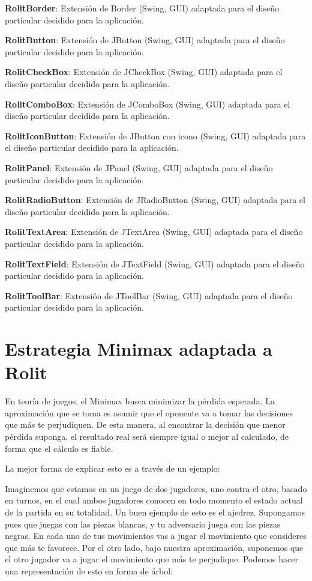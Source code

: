 \documentclass[../DocumentoOficial.tex]{subfiles}
\begin{document}
\textbf{RolitBorder}: Extensión de Border (Swing, GUI) adaptada para el diseño particular decidido para la aplicación.

\textbf{RolitButton}: Extensión de JButton (Swing, GUI) adaptada para el diseño particular decidido para la aplicación.

\textbf{RolitCheckBox}: Extensión de JCheckBox (Swing, GUI) adaptada para el diseño particular decidido para la aplicación.

\textbf{RolitComboBox}: Extensión de JComboBox (Swing, GUI) adaptada para el diseño particular decidido para la aplicación.

\textbf{RolitIconButton}: Extensión de JButton con icono (Swing, GUI) adaptada para el diseño particular decidido para la aplicación.

\textbf{RolitPanel}: Extensión de JPanel (Swing, GUI) adaptada para el diseño particular decidido para la aplicación.

\textbf{RolitRadioButton}: Extensión de JRadioButton (Swing, GUI) adaptada para el diseño particular decidido para la aplicación.

\textbf{RolitTextArea}: Extensión de JTextArea (Swing, GUI) adaptada para el diseño particular decidido para la aplicación.

\textbf{RolitTextField}: Extensión de JTextField (Swing, GUI) adaptada para el diseño particular decidido para la aplicación.

\textbf{RolitToolBar}: Extensión de JToolBar (Swing, GUI) adaptada para el diseño particular decidido para la aplicación.

\chapter{Estrategia Minimax adaptada a Rolit}
\label{ch:AnexoIII}

En teoría de juegos, el Minimax busca minimizar la pérdida esperada. La aproximación que se toma es asumir que el oponente va a tomar las decisiones que más te perjudiquen. De esta manera, al encontrar la decisión que menor pérdida suponga, el resultado real será siempre igual o mejor al calculado, de forma que el cálculo es fiable.

La mejor forma de explicar esto es a través de un ejemplo:

Imaginemos que estamos en un juego de dos jugadores, uno contra el otro, basado en turnos, en el cual ambos jugadores conocen en todo momento el estado actual de la partida en su totalidad. Un buen ejemplo de esto es el ajedrez. Supongamos pues que juegas con las piezas blancas, y tu adversario juega con las piezas negras. En cada uno de tus movimientos vas a jugar el movimiento que consideres que más te favorece. Por el otro lado, bajo nuestra aproximación, suponemos que el otro jugador va a jugar el movimiento que más te perjudique. Podemos hacer una representación de esto en forma de árbol:
\end{document}
